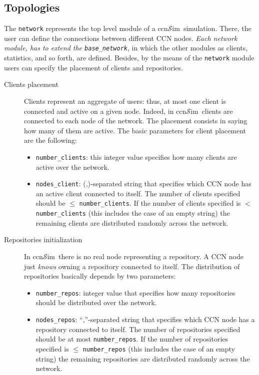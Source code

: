 \documentclass{article}
\newcommand{\ccnsim}{ccn$\mathcal{S}$im}
\begin{document}
\subsection{Topologies}
The \texttt{network} represents the top level module of a \ccnsim\ simulation. There, the user can define the connections between different CCN nodes. \emph{Each network module, has to extend the \texttt{base\_network}}, in which the other modules as clients, statistics, and so forth, are defined. Besides, by the means of the \texttt{network} module users can specify the placement of clients and repositories.
\begin{description}
    \item[Clients placement] Clients represent an aggregate of users: thus, at most one client is connected and active on a given node. Indeed, in \ccnsim\ clients are connected to each node of the network. The placement consists in saying how many of them are active. The basic parameters for client placement are the following:
	\begin{itemize}
	    \item \verb|number_clients|: this integer value specifies how many clients are active over the network. 
	    \item \verb|nodes_client|: (,)-separated string that specifies which CCN node has an active client connected to itself.  The number of clients specified should be $\leq$ \verb|number_clients|. If the number of clients specified is $<$ \verb|number_clients| (this includes the case of an empty string) the remaining clients are distributed randomly across the network. 
	\end{itemize}
    \item[Repositories initialization]  In \ccnsim\ there is no real node representing a repository. A CCN node just  \emph{knows} owning a repository connected to itself. The distribution of repositories basically depends by two parameters:
	\begin{itemize}
	    \item \verb|number_repos|: integer value that specifies how many repositories should be distributed over the network.
	    \item \verb|nodes_repos|: ``,''-separated string that specifies which CCN node has a repository connected to itself.  The number of repositories specified should be at most \verb|number_repos|. If the number of repositories specified is $\leq$ \verb|number_repos| (this includes the case of an empty string) the remaining repositories are distributed randomly across the network. 
	\end{itemize}
\end{description}
\end{document}
